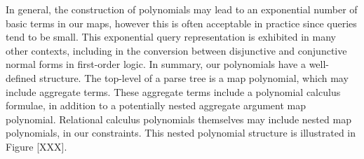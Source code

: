 In general, the construction of polynomials may lead to an exponential number of
basic terms in our maps, however this is often acceptable in practice since
queries tend to be small. This exponential query representation is exhibited in
many other contexts, including in the conversion between disjunctive and
conjunctive normal forms in first-order logic. In summary, our polynomials have
a well-defined structure. The top-level of a parse tree is a map polynomial,
which may include aggregate terms. These aggregate terms include a polynomial
calculus formulae, in addition to a potentially nested aggregate argument map
polynomial. Relational calculus polynomials themselves may include nested map
polynomials, in our constraints.  This nested polynomial structure is
illustrated in Figure [XXX].


